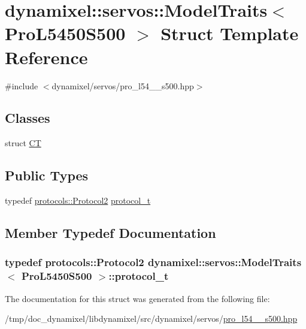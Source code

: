 \hypertarget{structdynamixel_1_1servos_1_1_model_traits_3_01_pro_l5450_s500_01_4}{}\section{dynamixel\+:\+:servos\+:\+:Model\+Traits$<$ Pro\+L5450\+S500 $>$ Struct Template Reference}
\label{structdynamixel_1_1servos_1_1_model_traits_3_01_pro_l5450_s500_01_4}


{\ttfamily \#include $<$dynamixel/servos/pro\+\_\+l54\+\_\+\_\+s500.\+hpp$>$}

\subsection*{Classes}
\begin{DoxyCompactItemize}
\item 
struct \hyperlink{structdynamixel_1_1servos_1_1_model_traits_3_01_pro_l5450_s500_01_4_1_1_c_t}{C\+T}
\end{DoxyCompactItemize}
\subsection*{Public Types}
\begin{DoxyCompactItemize}
\item 
typedef \hyperlink{classdynamixel_1_1protocols_1_1_protocol2}{protocols\+::\+Protocol2} \hyperlink{structdynamixel_1_1servos_1_1_model_traits_3_01_pro_l5450_s500_01_4_a7f0cf39c13edec9520e06dc4d36ee83f}{protocol\+\_\+t}
\end{DoxyCompactItemize}


\subsection{Member Typedef Documentation}
\hypertarget{structdynamixel_1_1servos_1_1_model_traits_3_01_pro_l5450_s500_01_4_a7f0cf39c13edec9520e06dc4d36ee83f}{}
\subsubsection[{protocol\+\_\+t}]{\setlength{\rightskip}{0pt plus 5cm}typedef {\bf protocols\+::\+Protocol2} {\bf dynamixel\+::servos\+::\+Model\+Traits}$<$ {\bf Pro\+L5450\+S500} $>$\+::{\bf protocol\+\_\+t}}\label{structdynamixel_1_1servos_1_1_model_traits_3_01_pro_l5450_s500_01_4_a7f0cf39c13edec9520e06dc4d36ee83f}


The documentation for this struct was generated from the following file\+:\begin{DoxyCompactItemize}
\item 
/tmp/doc\+\_\+dynamixel/libdynamixel/src/dynamixel/servos/\hyperlink{pro__l54__50__s500_8hpp}{pro\+\_\+l54\+\_\+\_\+s500.\+hpp}\end{DoxyCompactItemize}

